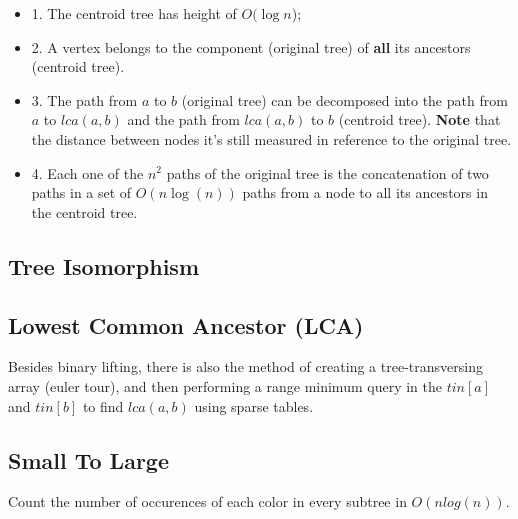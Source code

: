 \begin{itemize}
	\item 1. The centroid tree has height of $O(\log{n}$);

	\item 2. A vertex belongs to the component (original tree) of \textbf{all} its ancestors (centroid tree).
	
	\item 3. The path from $a$ to $b$ (original tree) can be decomposed into the path from $a$ to $lca(a,b)$ 
	and the path from $lca(a,b)$ to $b$ (centroid tree).
	\textbf{Note} that the distance between nodes it's still measured in reference to the original tree.
	
	\item 4. Each one of the $n^2$ paths of the original tree is the concatenation of 
	two paths in a set of $O(n \log(n))$ paths from a node to all its ancestors in the 
	centroid tree.
\end{itemize}


\subsection{Tree Isomorphism}

\vspace{10pt}


\subsection{Lowest Common Ancestor (LCA)}
	Besides binary lifting, there is also the method of creating a tree-transversing array (euler tour),
	and then performing a range minimum query in the $tin[a]$ and $tin[b]$ to find $lca(a, b)$ using sparse tables.



\subsection{Small To Large}

	Count the number of occurences of each color in every subtree in $O(n log(n))$.

